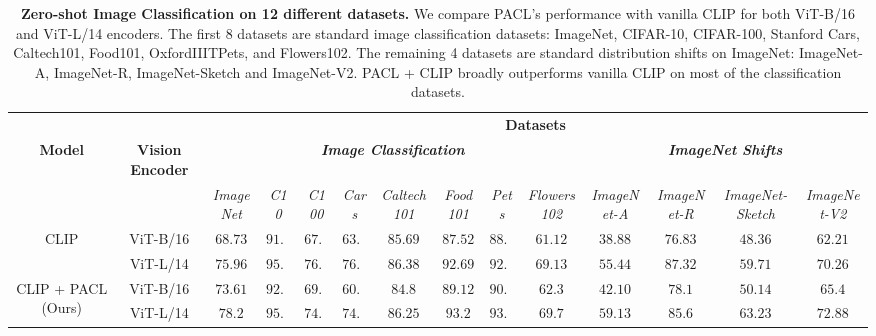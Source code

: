 \documentclass[10pt,twocolumn,letterpaper]{article}
\begin{document}
\begin{table*}[!t]
    \centering
    \scriptsize
    \resizebox{0.95\linewidth}{!}
    {
    \begin{tabular}{c|c|cccccccc|cccc}
    \toprule
    & & \multicolumn{12}{c}{\textbf{Datasets}} \\
    \textbf{Model} & \textbf{Vision Encoder} & \multicolumn{8}{c}{\textbf{\textit{Image Classification}}} & \multicolumn{4}{c}{\textbf{\textit{ImageNet Shifts}}} \\
    & & \textit{ImageNet} \cite{deng2009imagenet} & \textit{C10} \cite{krizhevsky2009learning} & \textit{C100} \cite{krizhevsky2009learning} & \textit{Cars} \cite{KrauseStarkDengFei-Fei_3DRR2013} & \textit{Caltech101} \cite{caltech101} & \textit{Food101} \cite{bossard14} & \textit{Pets} \cite{parkhi12a} & \textit{Flowers102} \cite{Nilsback08} & \textit{ImageNet-A} \cite{hendrycks2021natural} & \textit{ImageNet-R} \cite{hendrycks2021many} & \textit{ImageNet-Sketch} \cite{wang2019learning} & \textit{ImageNet-V2} \cite{recht2019imagenet} \\
    \midrule
    \multirow{2}{*}{CLIP} & ViT-B/16 & $68.73$ & $91.18$ & $67.88$ & $63.50$ & $85.69$ & $87.52$ & $88.44$ & $61.12$ & $38.88$ & $76.83$ & $48.36$ & $62.21$ \\
                          & ViT-L/14 & $75.96$ & $95.85$ & $76.94$ & $76.9$ & $86.38$ & $92.69$ & $92.91$ & $69.13$ & $55.44$ & $87.32$ & $59.71$ & $70.26$ \\
    \midrule
    \multirow{2}{*}{CLIP + PACL (Ours)} & ViT-B/16 & $73.61$ & $92.3$ & $69.11$ & $60.7$ & $84.8$ & $89.12$ & $90.1$ & $62.3$ & $42.10$ & $78.1$ & $50.14$ & $65.4$ \\
                                 & ViT-L/14 & $78.2$ & $95.13$ & $74.43$ & $74.2$ & $86.25$ & $93.2$ & $93.05$ & $69.7$ & $59.13$ & $85.6$ & $63.23$ & $72.88$ \\
    \bottomrule
    \end{tabular}
    }
    \vspace{-3mm}
    \caption{\textbf{Zero-shot Image Classification on 12 different datasets.} We compare PACL's performance with vanilla CLIP for both ViT-B/16 and ViT-L/14 encoders. The first 8 datasets are standard image classification datasets: ImageNet, CIFAR-10, CIFAR-100, Stanford Cars, Caltech101, Food101, OxfordIIITPets, and Flowers102. The remaining 4 datasets are standard distribution shifts on ImageNet: ImageNet-A, ImageNet-R, ImageNet-Sketch and ImageNet-V2. PACL + CLIP broadly outperforms vanilla CLIP on most of the classification datasets.}
    \label{table:zeroshot_image_classification}
\end{table*}
\end{document}
